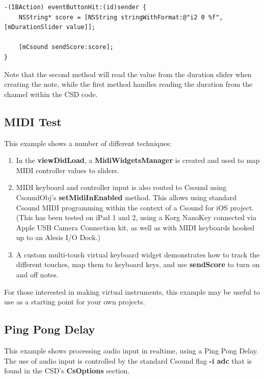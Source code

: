 \documentclass[11pt]{article}
\begin{document}
\begin{lstlisting}[caption=Example code showing sending score text to CsoundObj]
-(IBAction) eventButtonHit:(id)sender {
    NSString* score = [NSString stringWithFormat:@"i2 0 %f", [mDurationSlider value]];

    [mCsound sendScore:score];
}
\end{lstlisting}

Note that the second method will read the value from the duration slider when creating the note, while the first method handles reading the duration from the channel within the CSD code. 

\subsection{MIDI Test}

This example shows a number of different techniques:

\begin{enumerate}
\item In the \textbf{viewDidLoad}, a \textbf{MidiWidgetsManager} is created and used to map MIDI controller values to sliders.
\item MIDI keyboard and controller input is also routed to Csound using CsoundObj's \textbf{setMidiInEnabled} method. This allows using standard Csound MIDI programming within the context of a Csound for iOS project. (This has been tested on iPad 1 and 2, using a Korg NanoKey connected via Apple USB Camera Connection kit, as well as with MIDI keyboards hooked up to an Alesis I/O Dock.) 
\item A custom multi-touch virtual keyboard widget demonstrates how to track the different touches, map them to keyboard keys, and use \textbf{sendScore} to turn on and off notes. 
\end{enumerate}

For those interested in making virtual instruments, this example may be useful to use as a starting point for your own projects.

\subsection{Ping Pong Delay}

This example shows processing audio input in realtime, using a Ping Pong Delay. The use of audio input is controlled by the standard Csound flag \textbf{-i adc} that is found in the CSD's \textbf{CsOptions} section.  
\end{document}

